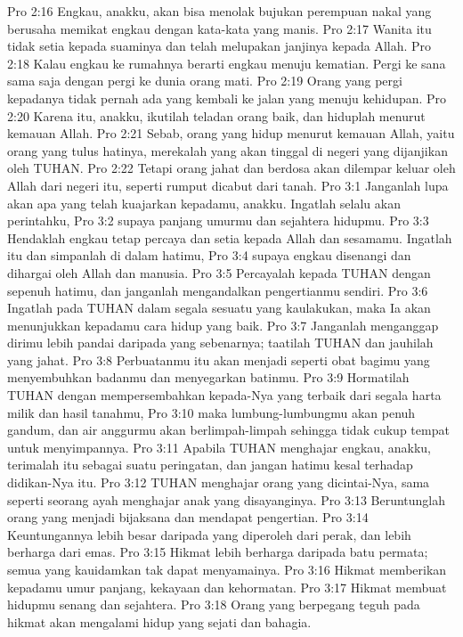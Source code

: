 Pro 2:16  Engkau, anakku, akan bisa menolak bujukan perempuan nakal yang berusaha memikat engkau dengan kata-kata yang manis.
Pro 2:17  Wanita itu tidak setia kepada suaminya dan telah melupakan janjinya kepada Allah.
Pro 2:18  Kalau engkau ke rumahnya berarti engkau menuju kematian. Pergi ke sana sama saja dengan pergi ke dunia orang mati.
Pro 2:19  Orang yang pergi kepadanya tidak pernah ada yang kembali ke jalan yang menuju kehidupan.
Pro 2:20  Karena itu, anakku, ikutilah teladan orang baik, dan hiduplah menurut kemauan Allah.
Pro 2:21  Sebab, orang yang hidup menurut kemauan Allah, yaitu orang yang tulus hatinya, merekalah yang akan tinggal di negeri yang dijanjikan oleh TUHAN.
Pro 2:22  Tetapi orang jahat dan berdosa akan dilempar keluar oleh Allah dari negeri itu, seperti rumput dicabut dari tanah.
Pro 3:1  Janganlah lupa akan apa yang telah kuajarkan kepadamu, anakku. Ingatlah selalu akan perintahku,
Pro 3:2  supaya panjang umurmu dan sejahtera hidupmu.
Pro 3:3  Hendaklah engkau tetap percaya dan setia kepada Allah dan sesamamu. Ingatlah itu dan simpanlah di dalam hatimu,
Pro 3:4  supaya engkau disenangi dan dihargai oleh Allah dan manusia.
Pro 3:5  Percayalah kepada TUHAN dengan sepenuh hatimu, dan janganlah mengandalkan pengertianmu sendiri.
Pro 3:6  Ingatlah pada TUHAN dalam segala sesuatu yang kaulakukan, maka Ia akan menunjukkan kepadamu cara hidup yang baik.
Pro 3:7  Janganlah menganggap dirimu lebih pandai daripada yang sebenarnya; taatilah TUHAN dan jauhilah yang jahat.
Pro 3:8  Perbuatanmu itu akan menjadi seperti obat bagimu yang menyembuhkan badanmu dan menyegarkan batinmu.
Pro 3:9  Hormatilah TUHAN dengan mempersembahkan kepada-Nya yang terbaik dari segala harta milik dan hasil tanahmu,
Pro 3:10  maka lumbung-lumbungmu akan penuh gandum, dan air anggurmu akan berlimpah-limpah sehingga tidak cukup tempat untuk menyimpannya.
Pro 3:11  Apabila TUHAN menghajar engkau, anakku, terimalah itu sebagai suatu peringatan, dan jangan hatimu kesal terhadap didikan-Nya itu.
Pro 3:12  TUHAN menghajar orang yang dicintai-Nya, sama seperti seorang ayah menghajar anak yang disayanginya.
Pro 3:13  Beruntunglah orang yang menjadi bijaksana dan mendapat pengertian.
Pro 3:14  Keuntungannya lebih besar daripada yang diperoleh dari perak, dan lebih berharga dari emas.
Pro 3:15  Hikmat lebih berharga daripada batu permata; semua yang kauidamkan tak dapat menyamainya.
Pro 3:16  Hikmat memberikan kepadamu umur panjang, kekayaan dan kehormatan.
Pro 3:17  Hikmat membuat hidupmu senang dan sejahtera.
Pro 3:18  Orang yang berpegang teguh pada hikmat akan mengalami hidup yang sejati dan bahagia.
